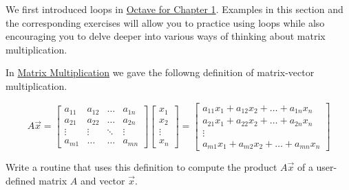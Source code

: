 \documentclass{ximera}
\begin{document}
    We first introduced loops in \href{https://ximera.osu.edu/linearalgebradzv3/xOctave/OCT_vectors/main}{Octave for Chapter 1}.  Examples in this section and the corresponding exercises will allow you to practice using loops while also encouraging you to delve deeper into various ways of thinking about matrix multiplication. 

    \begin{example}\label{ex:oct_mat_prod_def}
        In \href{https://ximera.osu.edu/linearalgebradzv3/LinearAlgebraInteractiveIntro/MAT-0020/main}{Matrix Multiplication} we gave the followng definition of matrix-vector multiplication.  
        
                      $$A\vec{x}=\begin{bmatrix}
                       a_{11} & a_{12}&\dots&a_{1n}\\
                       a_{21}&a_{22} &\dots &a_{2n}\\
                    \vdots & \vdots&\ddots &\vdots\\
                    a_{m1}&\dots &\dots &a_{mn}
                     \end{bmatrix}\begin{bmatrix}x_1\\x_2\\\vdots\\x_n\end{bmatrix}=
                     \begin{bmatrix}a_{11}x_1+a_{12}x_2+\ldots +a_{1n}x_n\\a_{21}x_1+a_{22}x_2+\ldots +a_{2n}x_n\\\vdots\\a_{m1}x_1+a_{m2}x_2+\ldots +a_{mn}x_n\end{bmatrix}$$
        
        Write a routine that uses this definition to compute the product $A\vec{x}$ of a user-defined matrix $A$ and vector $\vec{x}$.


\end{example}
\end{document}
